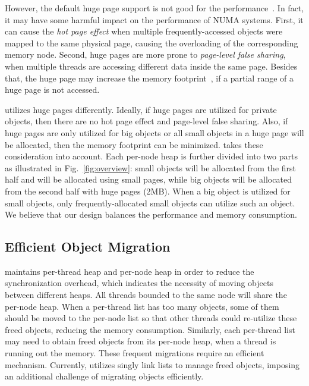 However, the default huge page support is not good for the performance~\cite{Gaud:2014:LPM:2643634.2643659, DBLP:conf/asplos/PanwarBG19}. In fact, it may have some harmful impact on the performance of NUMA systems. First, it can cause the \textit{hot page effect} when multiple frequently-accessed objects  were  mapped  to  the  same  physical  page, causing the overloading of the corresponding memory node. Second, huge pages are more prone to \textit{page-level false sharing}, when multiple threads are accessing different data inside the same page. Besides that, the huge page may increase the memory footprint~\cite{DBLP:conf/asplos/MaasAIJMR20}, if a partial range of a huge page is not accessed. 

\NA{} utilizes huge pages differently. Ideally, if huge pages are utilized for private objects, then there are no hot page effect and page-level false sharing. Also, if huge pages are only utilized for big objects or all small objects in a huge page will be allocated, then the memory footprint can be minimized. \NA{} takes these consideration into account. Each per-node heap is further divided into two parts as illustrated in Fig.~\ref{fig:overview}: small objects will be allocated from the first half and will be allocated using small pages, while big objects will be allocated from the second half with huge pages (2MB). When a big object is utilized for small objects, only frequently-allocated small objects can utilize such an object. We believe that our design balances the performance and memory consumption.   

\subsection{Efficient Object Migration} 

\NM{} maintains per-thread heap and per-node heap in order to reduce the synchronization overhead, which indicates the necessity of moving objects between different heaps. All threads bounded to the same node will share the per-node heap. When a per-thread list has too many objects, some of them should be moved to the per-node list so that other threads could re-utilize these freed objects, reducing the memory consumption. Similarly, each per-thread list may need to obtain freed objects from its per-node heap, when a thread is running out the memory. These frequent migrations require an efficient mechanism. Currently, \NM{} utilizes singly link lists to manage freed objects, imposing an additional challenge of migrating objects efficiently. 

